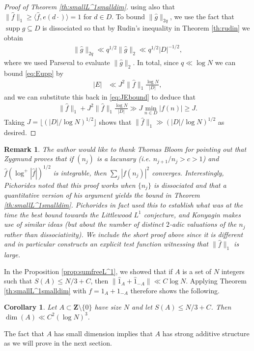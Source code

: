 \documentclass[11pt, reqno]{amsart}
\newtheorem{cor}[theorem]{Corollary}
\newtheorem*{rmk*}{Remark}
\DeclareMathOperator\supp{supp}
\begin{document}
\begin{proof}[Proof of Theorem \ref{th:smallL^1smalldim}]
using also that $\lVert \hat{f}\rVert_1 \geqslant \langle \hat{f}, e(d\cdot)\rangle=1$ for $d\in D$. To bound $\lVert \hat{g}\rVert_{2q}$, we use the fact that $\supp g\subseteq D$ is dissociated so that by Rudin's inequality in Theorem \ref{th:rudin} we obtain
\begin{align*}
    \lVert \hat{g}\rVert_{2q}\ll q^{1/2}\lVert \hat{g}\rVert_2\ll q^{1/2}|D|^{-1/2},
\end{align*}
where we used Parseval to evaluate $\lVert \hat{g}\rVert_2$.
In total, since $q\ll \log N$ we can bound \eqref{eq:Eupp} by
\begin{align*}
    |E|&\ll J^2\lVert \hat{f}\rVert_1 \frac{\log N}{|D|},
\end{align*}
and we can substitute this back in \eqref{eq:JEbound} to deduce that
\begin{align*}
    \lVert \hat{f}\rVert_1+J^2\lVert \hat{f}\rVert_1\frac{\log N }{|D|}\gg J\min_{n\in D}|f(n)|\geqslant J.
\end{align*}
Taking $J=\lfloor(|D|/\log N)^{1/2}\rfloor$ shows that $\lVert \hat{f}\rVert_1\gg (|D|/\log N)^{1/2}$ as desired.

\end{proof}
\begin{rmk*}
    \normalfont The author would like to thank Thomas Bloom for pointing out that Zygmund \cite[Chapter XII, (7.6)]{zygmund}  proves that if $(n_j)$ is a lacunary (i.e. $n_{j+1}/n_j>c>1$) and $\hat{f}(\log^+|\hat{f}|)^{1/2}$ is integrable, then $\sum_j |f(n_j)|^2$ converges. Interestingly, Pichorides noted that this proof works when $\{n_j\}$ is dissociated and that a quantitative version of his argument yields the bound in Theorem \ref{th:smallL^1smalldim}. Pichorides \cite{pichorides} in fact used this to establish what was at the time the best bound towards the Littlewood $L^1$ conjecture, and Konyagin \cite{konyaginl} makes use of similar ideas (but about the number of distinct $2$-adic valuations of the $n_j$ rather than dissociativity). We include the short proof above since it is different and in particular constructs an explicit test function witnessing that $\lVert \hat{f}\rVert_1$ is large.
\end{rmk*}
In the Proposition \ref{prop:sumfreeL^1}, we showed that if $A$ is a set of $N$ integers such that $S(A) \leqslant N/3+C$, then $\lVert \hat{1}_A+\hat{1}_{-A}\rVert \ll C\log N$. Applying Theorem \ref{th:smallL^1smalldim} with $f=1_A+1_{-A}$ therefore shows the following.
\begin{cor}\label{cor:sum-freesmalldim}
    Let $A\subset\mathbf{Z}\setminus\{0\}$ have size $N$ and let $S(A)\leqslant N/3+C$. Then $\dim(A)\ll C^2(\log N)^3$.
\end{cor}
The fact that $A$ has small dimension implies that $A$ has strong additive structure as we will prove in the next section. 
\end{document}
